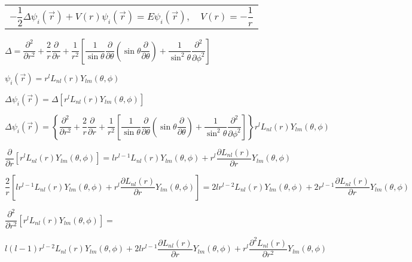 \documentclass{jarticle}%
\begin{document}
%
\begin{tabular}
[c]{ll}%
$-\dfrac{1}{2}\Delta\psi_{i}\left(  \vec{r}\right)  +V\left(  r\right)
\psi_{i}\left(  \vec{r}\right)  =E\psi_{i}\left(  \vec{r}\right)  ,$ &
$V\left(  r\right)  =-\dfrac{1}{r}$%
\end{tabular}


$\Delta=\dfrac{\partial^{2}}{\partial r^{2}}+\dfrac{2}{r}\dfrac{\partial
}{\partial r}+\dfrac{1}{r^{2}}\left[  \dfrac{1}{\sin\theta}\dfrac{\partial
}{\partial\theta}\left(  \sin\theta\dfrac{\partial}{\partial\theta}\right)
+\dfrac{1}{\sin^{2}\theta}\dfrac{\partial^{2}}{\partial\phi^{2}}\right]  $

$\psi_{i}\left(  \vec{r}\right)  =r^{l}L_{nl}\left(  r\right)  Y_{lm}\left(
\theta,\phi\right)  $

$\Delta\psi_{i}\left(  \vec{r}\right)  =\Delta\left[  r^{l}L_{nl}\left(
r\right)  Y_{lm}\left(  \theta,\phi\right)  \right]  $

$\Delta\psi_{i}\left(  \vec{r}\right)  =\left\{  \dfrac{\partial^{2}}{\partial
r^{2}}+\dfrac{2}{r}\dfrac{\partial}{\partial r}+\dfrac{1}{r^{2}}\left[
\dfrac{1}{\sin\theta}\dfrac{\partial}{\partial\theta}\left(  \sin\theta
\dfrac{\partial}{\partial\theta}\right)  +\dfrac{1}{\sin^{2}\theta}%
\dfrac{\partial^{2}}{\partial\phi^{2}}\right]  \right\}  r^{l}L_{nl}\left(
r\right)  Y_{lm}\left(  \theta,\phi\right)  $

$\dfrac{\partial}{\partial r}\left[  r^{l}L_{nl}\left(  r\right)
Y_{lm}\left(  \theta,\phi\right)  \right]  =lr^{l-1}L_{nl}\left(  r\right)
Y_{lm}\left(  \theta,\phi\right)  +r^{l}\dfrac{\partial L_{nl}\left(
r\right)  }{\partial r}Y_{lm}\left(  \theta,\phi\right)  $

$\dfrac{2}{r}\left[  lr^{l-1}L_{nl}\left(  r\right)  Y_{lm}\left(  \theta
,\phi\right)  +r^{l}\dfrac{\partial L_{nl}\left(  r\right)  }{\partial
r}Y_{lm}\left(  \theta,\phi\right)  \right]  =2lr^{l-2}L_{nl}\left(  r\right)
Y_{lm}\left(  \theta,\phi\right)  +2r^{l-1}\dfrac{\partial L_{nl}\left(
r\right)  }{\partial r}Y_{lm}\left(  \theta,\phi\right)  $

$\dfrac{\partial^{2}}{\partial r^{2}}\left[  r^{l}L_{nl}\left(  r\right)
Y_{lm}\left(  \theta,\phi\right)  \right]  =$

$l\left(  l-1\right)  r^{l-2}L_{nl}\left(  r\right)  Y_{lm}\left(  \theta
,\phi\right)  +2lr^{l-1}\dfrac{\partial L_{nl}\left(  r\right)  }{\partial
r}Y_{lm}\left(  \theta,\phi\right)  +r^{l}\dfrac{\partial^{2}L_{nl}\left(
r\right)  }{\partial r^{2}}Y_{lm}\left(  \theta,\phi\right)  $
\end{document}
